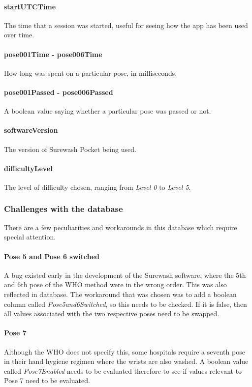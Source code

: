             \paragraph{startUTCTime} The time that a session was started, useful for seeing how the app has been used over time.
            \paragraph{pose001Time - pose006Time} How long was spent on a particular pose, in milliseconds.
            \paragraph{pose001Passed - pose006Passed} A boolean value saying whether a particular pose was passed or not.
            \paragraph{softwareVersion} The version of Surewash Pocket being used.
            \paragraph{difficultyLevel} The level of difficulty chosen, ranging from {\slshape Level 0} to {\slshape Level 5}.
        \subsubsection{Challenges with the database} There are a few peculiarities and workarounds in this database which require special attention.
            \paragraph{Pose 5 and Pose 6 switched} A bug existed early in the development of the Surewash software, where the 5th and 6th pose of the WHO method were in the wrong order. This was also reflected in database. The workaround that was chosen was to add a boolean column called {\slshape Pose5and6Switched}, so this needs to be checked. If it is false, then all values associated with the two respective poses need to be swapped.
            \paragraph{Pose 7} Although the WHO does not specify this, some hospitals require a seventh pose in their hand hygiene regimen where the wrists are also washed. A boolean value called {\slshape Pose7Enabled} needs to be evaluated therefore to see if values relevant to Pose 7 need to be evaluated.
